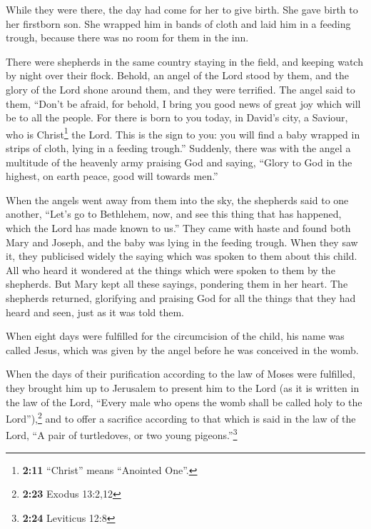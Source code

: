 While they were there, the day had come for her to give
birth.  She gave birth to her firstborn son. She wrapped
him in bands of cloth and laid him in a feeding trough, because there
was no room for them in the inn.

 There were shepherds in the same country staying in the
field, and keeping watch by night over their flock. 
Behold, an angel of the Lord stood by them, and the glory of the Lord
shone around them, and they were terrified.  The angel
said to them, ``Don't be afraid, for behold, I bring you good news of
great joy which will be to all the people.  For there is
born to you today, in David's city, a Saviour, who is Christ\footnote{\textbf{2:11}
  ``Christ'' means ``Anointed One''.} the Lord.  This is
the sign to you: you will find a baby wrapped in strips of cloth, lying
in a feeding trough.''  Suddenly, there was with the
angel a multitude of the heavenly army praising God and saying,
 ``Glory to God in the highest, on earth peace, good will
towards men.''

 When the angels went away from them into the sky, the
shepherds said to one another, ``Let's go to Bethlehem, now, and see
this thing that has happened, which the Lord has made known to us.''
 They came with haste and found both Mary and Joseph, and
the baby was lying in the feeding trough.  When they saw
it, they publicised widely the saying which was spoken to them about
this child.  All who heard it wondered at the things
which were spoken to them by the shepherds.  But Mary
kept all these sayings, pondering them in her heart.  The
shepherds returned, glorifying and praising God for all the things that
they had heard and seen, just as it was told them.

 When eight days were fulfilled for the circumcision of
the child, his name was called Jesus, which was given by the angel
before he was conceived in the womb.

 When the days of their purification according to the law
of Moses were fulfilled, they brought him up to Jerusalem to present him
to the Lord  (as it is written in the law of the Lord,
``Every male who opens the womb shall be called holy to the
Lord''),\footnote{\textbf{2:23} Exodus 13:2,12}  and to
offer a sacrifice according to that which is said in the law of the
Lord, ``A pair of turtledoves, or two young pigeons.''\footnote{\textbf{2:24}
  Leviticus 12:8}

